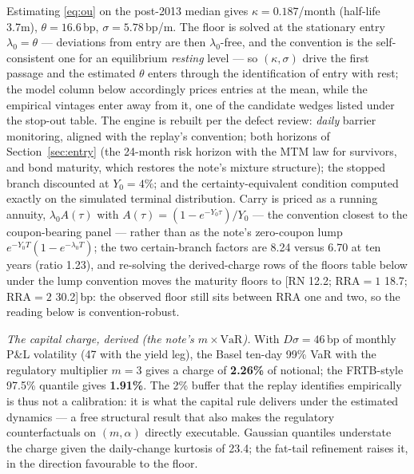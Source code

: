 \documentclass[11pt]{article}
\newcommand{\VaR}{\mathrm{VaR}}
\begin{document}
Estimating \eqref{eq:ou} on the post-2013 median gives $\kappa=0.187$/month (half-life 3.7m), $\theta=16.6$\,bp, $\sigma=5.78$\,bp/m. The floor is solved at the stationary entry $\lambda_0=\theta$ --- deviations from entry are then $\lambda_0$-free, and the convention is the self-consistent one for an equilibrium \emph{resting} level --- so $(\kappa,\sigma)$ drive the first passage and the estimated $\theta$ enters through the identification of entry with rest; the model column below accordingly prices entries at the mean, while the empirical vintages enter away from it, one of the candidate wedges listed under the stop-out table. The engine is rebuilt per the defect review: \emph{daily} barrier monitoring, aligned with the replay's convention; both horizons of Section~\ref{sec:entry} (the 24-month risk horizon with the MTM law for survivors, and bond maturity, which restores the note's mixture structure); the stopped branch discounted at $Y_0=4\%$; and the certainty-equivalent condition computed exactly on the simulated terminal distribution. Carry is priced as a running annuity, $\lambda_0 A(\tau)$ with $A(\tau)=(1-e^{-Y_0\tau})/Y_0$ --- the convention closest to the coupon-bearing panel --- rather than as the note's zero-coupon lump $e^{-Y_0T}(1-e^{-\lambda_0T})$; the two certain-branch factors are 8.24 versus 6.70 at ten years (ratio 1.23), and re-solving the derived-charge rows of the floors table below under the lump convention moves the maturity floors to [RN 12.2; RRA$=1$ 18.7; RRA$=2$ 30.2]\,bp: the observed floor still sits between RRA one and two, so the reading below is convention-robust.

\emph{The capital charge, derived (the note's $m\times\VaR$).} With $D\sigma=46$\,bp of monthly P\&L volatility (47 with the yield leg), the Basel ten-day 99\% VaR with the regulatory multiplier $m=3$ gives a charge of \textbf{2.26\%} of notional; the FRTB-style 97.5\% quantile gives \textbf{1.91\%}. The 2\% buffer that the replay identifies empirically is thus not a calibration: it is what the capital rule delivers under the estimated dynamics --- a free structural result that also makes the regulatory counterfactuals on $(m,\alpha)$ directly executable. Gaussian quantiles understate the charge given the daily-change kurtosis of 23.4; the fat-tail refinement raises it, in the direction favourable to the floor.
\end{document}
